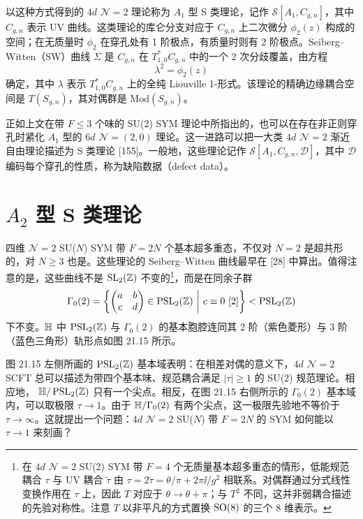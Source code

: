 \begin{definition}[21.29] 以这种方式得到的 $4d$ $\mathcal{N}=2$ 理论称为 $A_1$ 型 S 类理论，记作 $\mathcal{S}[A_1,C_{g,n}]$，其中 $C_{g,n}$ 表示 UV 曲线。这类理论的库仑分支对应于 $C_{g,n}$ 上二次微分 $\phi_2(z)$ 构成的空间；在无质量时 $\phi_2$ 在穿孔处有 1 阶极点，有质量时则有 2 阶极点。Seiberg–Witten（SW）曲线 $\Sigma$ 是 $C_{g,n}$ 在 $T^*_{1,0}C_{g,n}$ 中的一个 2 次分歧覆盖，由方程
\[
\lambda^2=\phi_2(z)
\]
确定，其中 $\lambda$ 表示 $T^*_{1,0}C_{g,n}$ 上的全纯 Liouville 1-形式。该理论的精确边缘耦合空间是 $T(S_{g,n})$，其对偶群是 $\mathrm{Mod}(S_{g,n})$。
\end{definition}

\begin{remark}[21.30] 正如上文在带 $F\le3$ 个味的 SU(2) SYM 理论中所指出的，也可以在存在非正则穿孔时紧化 $A_1$ 型的 $6d$ $\mathcal{N}=(2,0)$ 理论。这一进路可以把一大类 $4d$ $\mathcal{N}=2$ 渐近自由理论描述为 S 类理论 [155]。一般地，这些理论记作 $\mathcal{S}[A_1,C_{g,n},\mathcal{D}]$，其中 $\mathcal{D}$ 编码每个穿孔的性质，称为缺陷数据（defect data）。
\end{remark}

\section{$A_2$ 型 S 类理论}

四维 $\mathcal{N}=2$ SU($N$) SYM 带 $F=2N$ 个基本超多重态，不仅对 $N=2$ 是超共形的，对 $N\ge3$ 也是。这些理论的 Seiberg–Witten 曲线最早在 [28] 中算出。值得注意的是，这些曲线不是 $\operatorname{SL}_2(\mathbb{Z})$ 不变的\footnote{在 $4d$ $\mathcal{N}=2$ SU(2) SYM 带 $F=4$ 个无质量基本超多重态的情形，低能规范耦合 $\tau$ 与 UV 耦合 $\tilde\tau$ 由 $\tau=2\tilde\tau=\theta/\pi+2\pi\ii/g^2$ 相联系。对偶群通过分式线性变换作用在 $\tau$ 上，因此 $T$ 对应于 $\theta\to\theta+\pi$；与 $T^2$ 不同，这并非弱耦合描述的先验对称性。注意 $T$ 以非平凡的方式置换 $\operatorname{SO}(8)$ 的三个 8 维表示。}，而是在同余子群
\[
\Gamma_0(2)=\left\{\begin{pmatrix}a&b\\c&d\end{pmatrix}\in\PSL_2(\Z)\ \middle|\ c\equiv0\ [2]\right\}<\PSL_2(\Z)
\]
下不变。$\mathbb{H}$ 中 $\operatorname{PSL}_2(\mathbb{Z})$ 与 $\Gamma_0(2)$ 的基本胞腔连同其 2 阶（紫色菱形）与 3 阶（蓝色三角形）轨形点如图 21.15 所示。

图 21.15 左侧所画的 $\operatorname{PSL}_2(\mathbb{Z})$ 基本域表明：在相差对偶的意义下，$4d$ $\mathcal{N}=2$ SCFT 总可以描述为带四个基本味、规范耦合满足 $|\tau|\ge1$ 的 SU(2) 规范理论。相应地，
$\mathbb{H}/\operatorname{PSL}_2(\mathbb{Z})$ 只有一个尖点。相反，在图 21.15 右侧所示的 $\Gamma_0(2)$ 基本域内，可以取极限 $\tau\to1$。由于 $\mathbb{H}/\Gamma_0(2)$ 有两个尖点，这一极限先验地不等价于 $\tau\to\infty$。这就提出一个问题：$4d$ $\mathcal{N}=2$ SU($N$) 带 $F=2N$ 的 SYM 如何能以 $\tau\to1$ 来刻画？

